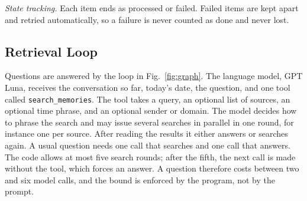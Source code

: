 \documentclass[conference]{IEEEtran}
\newcommand{\llmname}{GPT\nobreakdash-5.6 Luna}
\begin{document}
\textit{State tracking.} Each item ends as processed or failed. Failed items are kept apart and retried automatically, so a failure is never counted as done and never lost.

\subsection{Retrieval Loop}
Questions are answered by the loop in Fig.~\ref{fig:graph}. The language model, \llmname{}, receives the conversation so far, today's date, the question, and one tool called \texttt{search\_memories}. The tool takes a query, an optional list of sources, an optional time phrase, and an optional sender or domain. The model decides how to phrase the search and may issue several searches in parallel in one round, for instance one per source. After reading the results it either answers or searches again. A usual question needs one call that searches and one call that answers. The code allows at most five search rounds; after the fifth, the next call is made without the tool, which forces an answer. A question therefore costs between two and six model calls, and the bound is enforced by the program, not by the prompt.
\end{document}

